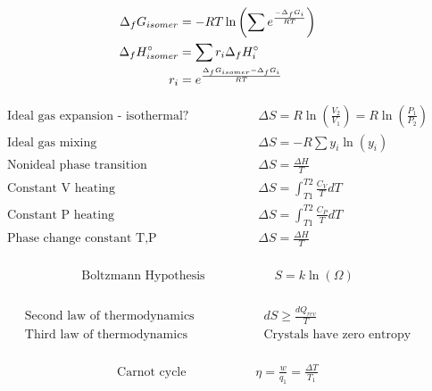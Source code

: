 \documentclass[10pt]{article} %
\begin{document}
\begin{align*}
  \Delta_f G_{isomer} &= -RT\ln\left(\sum e^{\frac{-\Delta_f G_i}{RT}}\right)\\
  \Delta_f H_{isomer}\degree &= \sum r_i \Delta_f H_i\degree\\
  r_i &= e^{\frac{\Delta_f G_{isomer} - \Delta_f G_i}{RT}}\\
\end{align*}

\begin{align*}
  \mbox{Ideal gas expansion - isothermal?}&\hspace{2cm}\Delta S = R\ln(\frac{V_2}{V_1}) = R\ln(\frac{P_1}{P_2})\\
  \mbox{Ideal gas mixing}&\hspace{2cm}\Delta S = -R\sum y_i\ln(y_i)\\
  \mbox{Nonideal phase transition}&\hspace{2cm} \Delta S = \frac{\Delta H}{T}\\
  \mbox{Constant V heating}&\hspace{2cm} \Delta S = \int_{T1}^{T2} \frac{C_V}{T}dT\\
  \mbox{Constant P heating}&\hspace{2cm} \Delta S = \int_{T1}^{T2} \frac{C_P}{T}dT\\
  \mbox{Phase change constant T,P}&\hspace{2cm} \Delta S = \frac{\Delta H}{T}\\
\end{align*}

\begin{align*}
  \mbox{Boltzmann Hypothesis}&\hspace{2cm} S = k\ln(\Omega)\\
\end{align*}

\begin{align*}
  \mbox{Second law of thermodynamics}&\hspace{2cm} dS \geq \frac{dQ_{rev}}{T}\\
  \mbox{Third law of thermodynamics}&\hspace{2cm}\mbox{Crystals have zero entropy}\\
\end{align*}

\begin{align*}
  \mbox{Carnot cycle}&\hspace{2cm}\eta = \frac{w}{q_1} = \frac{\Delta T}{T_1}\\
\end{align*}
\end{document}
